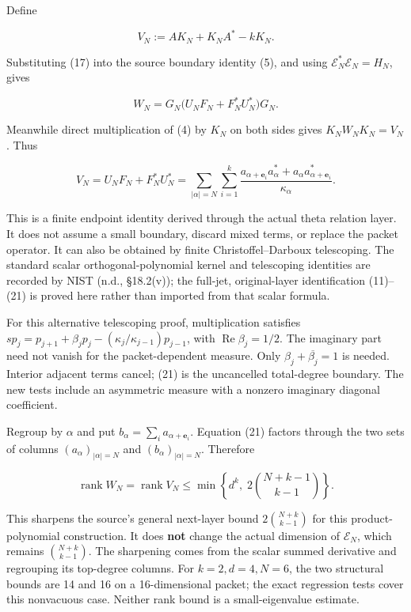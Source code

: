 Define

\[
\boxed{V_N:=AK_N+K_NA^*-kK_N.}
\tag{19}
\]

Substituting (17) into the source boundary identity (5), and using
\(\mathscr E_N^*\mathscr E_N=H_N\), gives

\[
\boxed{W_N=G_N\bigl(U_NF_N+F_N^*U_N^*\bigr)G_N.}
\tag{20}
\]

Meanwhile direct multiplication of (4) by \(K_N\) on both sides gives
\(K_NW_NK_N=V_N\). Thus

\[
\boxed{V_N=U_NF_N+F_N^*U_N^*
=\sum_{|\alpha|=N}\sum_{i=1}^k
\frac{a_{\alpha+\mathbf e_i}a_\alpha^*
+a_\alpha a_{\alpha+\mathbf e_i}^*}{\kappa_\alpha}.}
\tag{21}
\]

This is a finite endpoint identity derived through the actual theta
relation layer. It does not assume a small boundary, discard mixed
terms, or replace the packet operator. It can also be obtained by finite
Christoffel--Darboux telescoping. The standard scalar
orthogonal-polynomial kernel and telescoping identities are recorded by
NIST (n.d., §18.2(v)); the full-jet, original-layer identification
(11)--(21) is proved here rather than imported from that scalar formula.

For this alternative telescoping proof, multiplication satisfies
\(s p_j=p_{j+1}+\beta_jp_j-(\kappa_j/\kappa_{j-1})p_{j-1}\), with
\(\operatorname{Re}\beta_j=1/2\). The imaginary part need not vanish for
the packet-dependent measure. Only \(\beta_j+\overline{\beta_j}=1\) is
needed. Interior adjacent terms cancel; (21) is the uncancelled
total-degree boundary. The new tests include an asymmetric measure with
a nonzero imaginary diagonal coefficient.

Regroup by \(\alpha\) and put
\(b_\alpha=\sum_i a_{\alpha+\mathbf e_i}\). Equation (21) factors
through the two sets of columns \((a_\alpha)_{|\alpha|=N}\) and
\((b_\alpha)_{|\alpha|=N}\). Therefore

\[
\boxed{\operatorname{rank}W_N=\operatorname{rank}V_N
\le\min\left\{d^k,\;2\binom{N+k-1}{k-1}\right\}.}
\tag{22}
\]

This sharpens the source's general next-layer bound
\(2\binom{N+k}{k-1}\) for this product-polynomial construction. It does
\textbf{not} change the actual dimension of \(\mathcal E_N\), which
remains \(\binom{N+k}{k-1}\). The sharpening comes from the scalar
summed derivative and regrouping its top-degree columns. For
\(k=2,d=4,N=6\), the two structural bounds are 14 and 16 on a
16-dimensional packet; the exact regression tests cover this nonvacuous
case. Neither rank bound is a small-eigenvalue estimate.

